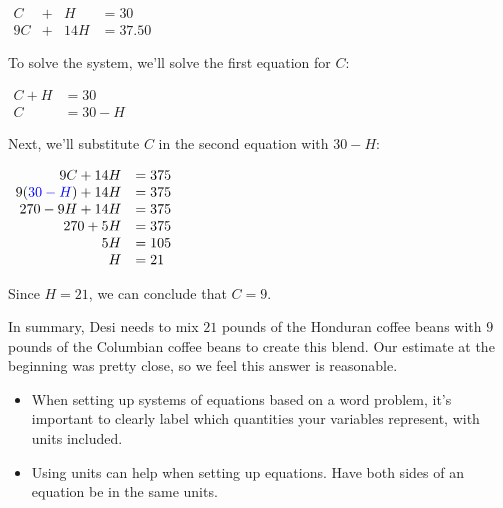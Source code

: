 \documentclass[nooutcomes]{ximera}
\begin{document}
\begin{example}
\begin{explanation}
\begin{center}
$
            \begin{array}{cccc}
            C&+& H&=30 \\
            9C&+& 14H&=37.50
            \end{array}
$
 \end{center}

          To solve the system, we'll solve the first equation for $C$:
\begin{center}
$
\begin{array}{rl}
            C+H&=30\\
            C&=30-H
\end{array}
$
\end{center}
          Next, we'll substitute $C$ in the second equation with $30-H$:
\begin{center}
$
    \begin{array}{rl}
            9C+14H&=375 \\
            9({\color{blue}{{30-H}}})+14H&=375 \\
            270-9H+14H&=375 \\
            270+5H&=375 \\
            5H&=105 \\
            H&=21
 \end{array}
$
\end{center}
          Since $H=21$, we can conclude that $C=9$.

          In summary, Desi needs to mix $21$ pounds of the Honduran coffee beans with $9$ pounds of the Columbian coffee beans to create this blend.
          Our estimate at the beginning was pretty close,
          so we feel this answer is reasonable.
\end{explanation}
\end{example}

\begin{summary}
	\begin{itemize}
		\item When setting up systems of equations based on a word problem, it's important to clearly label which quantities your variables represent, with units included.
		\item Using units can help when setting up equations. Have both sides of an equation be in the same units.  
	\end{itemize}
\end{summary}
\end{document}
